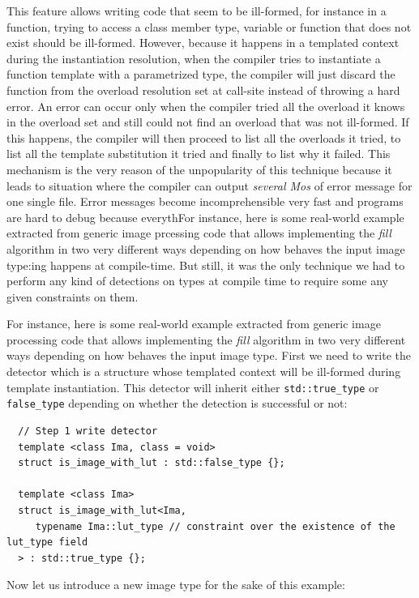 This feature allows writing code that seem to be ill-formed, for instance in a function, trying to access a class member
type, variable or function that does not exist should be ill-formed. However, because it happens in a templated context
during the instantiation resolution, when the compiler tries to instantiate a function template with a parametrized
type, the compiler will just discard the function from the overload resolution set at call-site instead of throwing a
hard error. An error can occur only when the compiler tried all the overload it knows in the overload set and still
could not find an overload that was not ill-formed. If this happens, the compiler will then proceed to list all the
overloads it tried, to list all the template substitution it tried and finally to list why it failed. This mechanism is
the very reason of the unpopularity of this technique because it leads to situation where the compiler can output
\emph{several Mos} of error message for one single file. Error messages become incomprehensible very fast and programs
are hard to debug because everythFor instance, here is some real-world example extracted from generic image prcessing
code that allows implementing the \emph{fill} algorithm in two very different ways depending on how behaves the input
image type:ing happens at compile-time. But still, it was the only technique we had to perform any kind of detections on
types at compile time to require some any given constraints on them.

For instance, here is some real-world example extracted from generic image processing code that allows implementing the
\emph{fill} algorithm in two very different ways depending on how behaves the input image type. First we need to write
the detector which is a structure whose templated context will be ill-formed during template instantiation. This
detector will inherit either \texttt{std::true\_type} or \texttt{false\_type} depending on whether the detection is
successful or not:

\begin{verbatim}
  // Step 1 write detector
  template <class Ima, class = void>
  struct is_image_with_lut : std::false_type {};

  template <class Ima>
  struct is_image_with_lut<Ima,
     typename Ima::lut_type // constraint over the existence of the lut_type field
  > : std::true_type {};
\end{verbatim}

Now let us introduce a new image type for the sake of this example:

